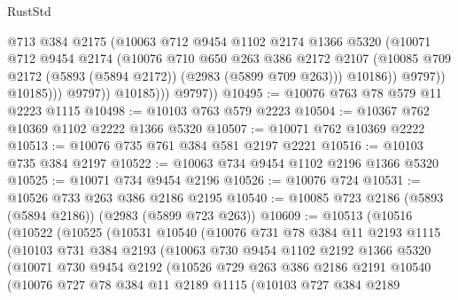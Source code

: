 \begin{lexlean}{RustStd}
\begin{coremodule}
                          @713
                          @384
                          @2175
                          (@10063
                            @712
                            @9454
                            @1102
                            @2174
                            @1366
                            @5320
                            (@10071
                              @712
                              @9454
                              @2174
                              (@10076
                                @710
                                @650
                                @263
                                @386
                                @2172
                                @2107
                                (@10085 @709 @2172 (@5893 (@5894 @2172)) (@2983 (@5899 @709 @263)))
                                @10186))
                            @9797))
                        @10185)))
                  @9797))
              @10185)))
        @9797))
@10495 := @10076 @763 @78 @579 @11 @2223 @1115
@10498 := @10103 @763 @579 @2223
@10504 := @10367 @762 @10369 @1102 @2222 @1366 @5320
@10507 := @10071 @762 @10369 @2222
@10513 := @10076 @735 @761 @384 @581 @2197 @2221
@10516 := @10103 @735 @384 @2197
@10522 := @10063 @734 @9454 @1102 @2196 @1366 @5320
@10525 := @10071 @734 @9454 @2196
@10526 := @10076 @724
@10531 := @10526 @733 @263 @386 @2186 @2195
@10540 := @10085 @723 @2186 (@5893 (@5894 @2186)) (@2983 (@5899 @723 @263))
@10609 := @10513
    (@10516
      (@10522
        (@10525
          (@10531
            @10540
            (@10076
              @731
              @78
              @384
              @11
              @2193
              @1115
              (@10103
                @731
                @384
                @2193
                (@10063
                  @730
                  @9454
                  @1102
                  @2192
                  @1366
                  @5320
                  (@10071
                    @730
                    @9454
                    @2192
                    (@10526
                      @729
                      @263
                      @386
                      @2186
                      @2191
                      @10540
                      (@10076
                        @727
                        @78
                        @384
                        @11
                        @2189
                        @1115
                        (@10103
                          @727
                          @384
                          @2189

\end{coremodule}
\end{lexlean}
